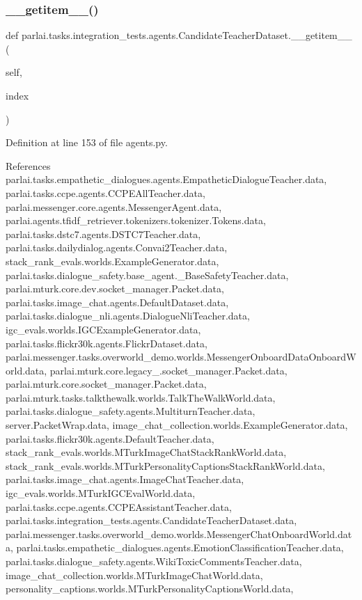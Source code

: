 \subsubsection{\texorpdfstring{\+\_\+\+\_\+getitem\+\_\+\+\_\+()}{\_\_getitem\_\_()}}
{\footnotesize\ttfamily def parlai.\+tasks.\+integration\+\_\+tests.\+agents.\+Candidate\+Teacher\+Dataset.\+\_\+\+\_\+getitem\+\_\+\+\_\+ (\begin{DoxyParamCaption}\item[{}]{self,  }\item[{}]{index }\end{DoxyParamCaption})}



Definition at line 153 of file agents.\+py.



References parlai.\+tasks.\+empathetic\+\_\+dialogues.\+agents.\+Empathetic\+Dialogue\+Teacher.\+data, parlai.\+tasks.\+ccpe.\+agents.\+C\+C\+P\+E\+All\+Teacher.\+data, parlai.\+messenger.\+core.\+agents.\+Messenger\+Agent.\+data, parlai.\+agents.\+tfidf\+\_\+retriever.\+tokenizers.\+tokenizer.\+Tokens.\+data, parlai.\+tasks.\+dstc7.\+agents.\+D\+S\+T\+C7\+Teacher.\+data, parlai.\+tasks.\+dailydialog.\+agents.\+Convai2\+Teacher.\+data, stack\+\_\+rank\+\_\+evals.\+worlds.\+Example\+Generator.\+data, parlai.\+tasks.\+dialogue\+\_\+safety.\+base\+\_\+agent.\+\_\+\+Base\+Safety\+Teacher.\+data, parlai.\+mturk.\+core.\+dev.\+socket\+\_\+manager.\+Packet.\+data, parlai.\+tasks.\+image\+\_\+chat.\+agents.\+Default\+Dataset.\+data, parlai.\+tasks.\+dialogue\+\_\+nli.\+agents.\+Dialogue\+Nli\+Teacher.\+data, igc\+\_\+evals.\+worlds.\+I\+G\+C\+Example\+Generator.\+data, parlai.\+tasks.\+flickr30k.\+agents.\+Flickr\+Dataset.\+data, parlai.\+messenger.\+tasks.\+overworld\+\_\+demo.\+worlds.\+Messenger\+Onboard\+Data\+Onboard\+World.\+data, parlai.\+mturk.\+core.\+legacy\+\_.\+socket\+\_\+manager.\+Packet.\+data, parlai.\+mturk.\+core.\+socket\+\_\+manager.\+Packet.\+data, parlai.\+mturk.\+tasks.\+talkthewalk.\+worlds.\+Talk\+The\+Walk\+World.\+data, parlai.\+tasks.\+dialogue\+\_\+safety.\+agents.\+Multiturn\+Teacher.\+data, server.\+Packet\+Wrap.\+data, image\+\_\+chat\+\_\+collection.\+worlds.\+Example\+Generator.\+data, parlai.\+tasks.\+flickr30k.\+agents.\+Default\+Teacher.\+data, stack\+\_\+rank\+\_\+evals.\+worlds.\+M\+Turk\+Image\+Chat\+Stack\+Rank\+World.\+data, stack\+\_\+rank\+\_\+evals.\+worlds.\+M\+Turk\+Personality\+Captions\+Stack\+Rank\+World.\+data, parlai.\+tasks.\+image\+\_\+chat.\+agents.\+Image\+Chat\+Teacher.\+data, igc\+\_\+evals.\+worlds.\+M\+Turk\+I\+G\+C\+Eval\+World.\+data, parlai.\+tasks.\+ccpe.\+agents.\+C\+C\+P\+E\+Assistant\+Teacher.\+data, parlai.\+tasks.\+integration\+\_\+tests.\+agents.\+Candidate\+Teacher\+Dataset.\+data, parlai.\+messenger.\+tasks.\+overworld\+\_\+demo.\+worlds.\+Messenger\+Chat\+Onboard\+World.\+data, parlai.\+tasks.\+empathetic\+\_\+dialogues.\+agents.\+Emotion\+Classification\+Teacher.\+data, parlai.\+tasks.\+dialogue\+\_\+safety.\+agents.\+Wiki\+Toxic\+Comments\+Teacher.\+data, image\+\_\+chat\+\_\+collection.\+worlds.\+M\+Turk\+Image\+Chat\+World.\+data, personality\+\_\+captions.\+worlds.\+M\+Turk\+Personality\+Captions\+World.\+data, 